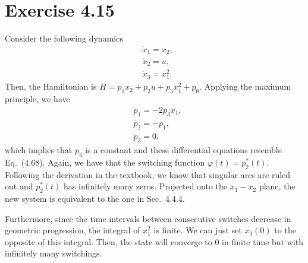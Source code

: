 \documentclass[11pt]{report}
\begin{document}
\section*{Exercise 4.15}
Consider the following dynamics
\begin{align*}
&\dot{x}_1 = x_2,\\
&\dot{x}_2 = u,\\
&\dot{x}_3 = x_1^2.
\end{align*}
Then, the Hamiltonian is $H = p_1 x_2 + p_2 u + p_3 x_1^2 + p_0$. Applying the maximum principle, we have
\begin{align*}
&\dot{p}_1 = -2 p_3 x_1,\\
&\dot{p}_2 = -p_1,\\
&\dot{p}_3 = 0,
\end{align*}
which implies that $p_3$ is a constant and these differential equations resemble Eq.~(4.68). Again, we have that the switching function $\varphi(t) = p_2^*(t)$. Following the derivation in the textbook, we know that singular arcs are ruled out and $p_2^*(t)$ has infinitely many zeros. Projected onto the $x_1 - x_2$ plane, the new system is equivalent to the one in Sec.~4.4.4.

Furthermore, since the time intervals between consecutive switches decrease in geometric progression, the integral of $x_1^2$ is finite. We can just set $x_3(0)$ to the opposite of this integral. Then, the state will converge to $0$ in finite time but with infinitely many switchings.
\end{document}
